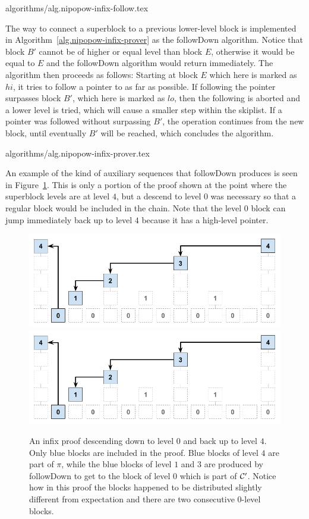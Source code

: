 {algorithms/alg.nipopow-infix-follow.tex}

The way to connect a superblock to a previous lower-level block is implemented
in Algorithm~\ref{alg.nipopow-infix-prover} as the followDown algorithm. Notice
that block $B'$ cannot be of higher or equal level than block $E$, otherwise it
would be equal to $E$ and the followDown algorithm would return immediately.
The algorithm then proceeds as follows: Starting at block $E$ which here is
marked as $hi$, it tries to follow a pointer to as far as possible. If
following the pointer surpasses block $B'$, which here is marked as $lo$, then
the following is aborted and a lower level is tried, which will cause a smaller
step within the skiplist. If a pointer was followed without surpassing $B'$,
the operation continues from the new block, until eventually $B'$ will be
reached, which concludes the algorithm.

{algorithms/alg.nipopow-infix-prover.tex}

An example of the kind of auxiliary sequences that followDown produces is seen
in Figure~\ref{fig.infix}. This is only a portion of the proof shown at the
point where the superblock levels are at level $4$, but a descend to level $0$
was necessary so that a regular block would be included in the chain. Note that
the level $0$ block can jump immediately back up to level $4$ because it has a
high-level pointer.

\begin{figure}[h]
    \caption{An infix proof descending down to level $0$ and back up to level
    $4$. Only blue blocks are included in the proof. Blue blocks of level $4$
    are part of $\pi$, while the blue blocks of level $1$ and $3$ are produced
    by followDown to get to the block of level $0$ which is part of $\mathcal{C}'$.
    Notice how in this proof the blocks happened to be distributed slightly
    different from expectation and there are two consecutive $0$-level blocks.}
    \centering
    \iftwocolumn
        \includegraphics[width=\columnwidth,keepaspectratio]{figures/infix.png}
    \else
        \includegraphics[width=0.7\columnwidth,keepaspectratio]{figures/infix.png}
    \fi
    \label{fig.infix}
\end{figure}

